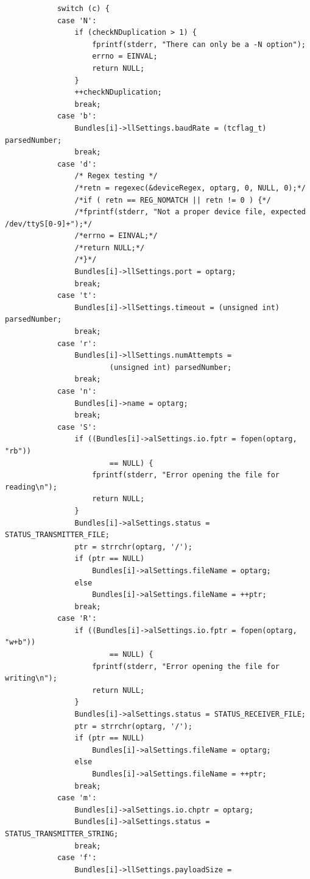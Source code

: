 \documentclass[a4paper]{article}
\begin{document}
\begin{verbatim}
            switch (c) {
            case 'N':
                if (checkNDuplication > 1) {
                    fprintf(stderr, "There can only be a -N option");
                    errno = EINVAL;
                    return NULL;
                }
                ++checkNDuplication;
                break;
            case 'b':
                Bundles[i]->llSettings.baudRate = (tcflag_t) parsedNumber;
                break;
            case 'd':
                /* Regex testing */
                /*retn = regexec(&deviceRegex, optarg, 0, NULL, 0);*/
                /*if ( retn == REG_NOMATCH || retn != 0 ) {*/
                /*fprintf(stderr, "Not a proper device file, expected /dev/ttyS[0-9]+");*/
                /*errno = EINVAL;*/
                /*return NULL;*/
                /*}*/
                Bundles[i]->llSettings.port = optarg;
                break;
            case 't':
                Bundles[i]->llSettings.timeout = (unsigned int) parsedNumber;
                break;
            case 'r':
                Bundles[i]->llSettings.numAttempts =
                        (unsigned int) parsedNumber;
                break;
            case 'n':
                Bundles[i]->name = optarg;
                break;
            case 'S':
                if ((Bundles[i]->alSettings.io.fptr = fopen(optarg, "rb"))
                        == NULL) {
                    fprintf(stderr, "Error opening the file for reading\n");
                    return NULL;
                }
                Bundles[i]->alSettings.status = STATUS_TRANSMITTER_FILE;
                ptr = strrchr(optarg, '/');
                if (ptr == NULL)
                    Bundles[i]->alSettings.fileName = optarg;
                else
                    Bundles[i]->alSettings.fileName = ++ptr;
                break;
            case 'R':
                if ((Bundles[i]->alSettings.io.fptr = fopen(optarg, "w+b"))
                        == NULL) {
                    fprintf(stderr, "Error opening the file for writing\n");
                    return NULL;
                }
                Bundles[i]->alSettings.status = STATUS_RECEIVER_FILE;
                ptr = strrchr(optarg, '/');
                if (ptr == NULL)
                    Bundles[i]->alSettings.fileName = optarg;
                else
                    Bundles[i]->alSettings.fileName = ++ptr;
                break;
            case 'm':
                Bundles[i]->alSettings.io.chptr = optarg;
                Bundles[i]->alSettings.status = STATUS_TRANSMITTER_STRING;
                break;
            case 'f':
                Bundles[i]->llSettings.payloadSize =

\end{verbatim}
\end{document}
